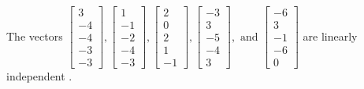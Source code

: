 \begin{exercise}
\begin{exerciseStatement}
  \end{exerciseStatement}
  \begin{exerciseAnswer}
   The vectors \(\left[\begin{array}{r}
3 \\
-4 \\
-4 \\
-3 \\
-3
\end{array}\right] , \left[\begin{array}{r}
1 \\
-1 \\
-2 \\
-4 \\
-3
\end{array}\right] , \left[\begin{array}{r}
2 \\
0 \\
2 \\
1 \\
-1
\end{array}\right] , \left[\begin{array}{r}
-3 \\
3 \\
-5 \\
-4 \\
3
\end{array}\right] , \text{ and } \left[\begin{array}{r}
-6 \\
3 \\
-1 \\
-6 \\
0
\end{array}\right]\) are 
  	 linearly independent  .
  


  \end{exerciseAnswer}
\end{exercise}
